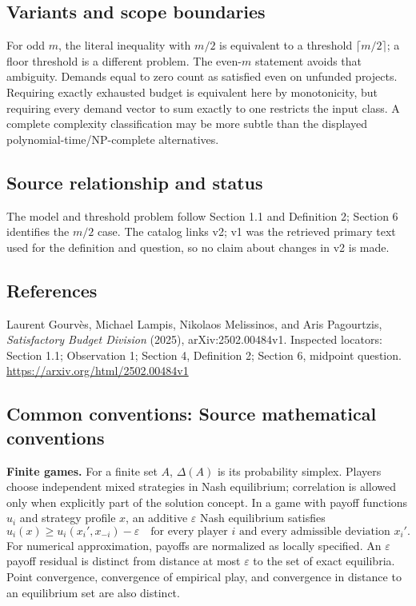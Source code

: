 \documentclass[11pt,a4paper]{article}
\begin{document}
\subsection*{Variants and scope boundaries}
For odd $m$, the literal inequality with $m/2$ is equivalent to a threshold $\lceil m/2\rceil$; a floor threshold is a different problem. The even-$m$ statement avoids that ambiguity. Demands equal to zero count as satisfied even on unfunded projects. Requiring exactly exhausted budget is equivalent here by monotonicity, but requiring every demand vector to sum exactly to one restricts the input class. A complete complexity classification may be more subtle than the displayed polynomial-time/NP-complete alternatives.

\subsection*{Source relationship and status}
The model and threshold problem follow Section 1.1 and Definition 2; Section 6 identifies the $m/2$ case. The catalog links v2; v1 was the retrieved primary text used for the definition and question, so no claim about changes in v2 is made.

\subsection*{References}
\begingroup\footnotesize\raggedright
\noindent [S1] Laurent Gourv\`es, Michael Lampis, Nikolaos Melissinos, and Aris Pagourtzis, \emph{Satisfactory Budget Division} (2025), arXiv:2502.00484v1. Inspected locators: Section 1.1; Observation 1; Section 4, Definition 2; Section 6, midpoint question.
\url{https://arxiv.org/html/2502.00484v1}
\par\endgroup

\subsection*{Common conventions: Source mathematical conventions}

\textbf{Finite games.} For a finite set $A$, $\Delta(A)$ is its probability
simplex. Players choose independent mixed strategies in Nash equilibrium;
correlation is allowed only when explicitly part of the solution concept.
In a game with payoff functions $u_i$ and strategy profile $x$, an additive
$\varepsilon$ Nash equilibrium satisfies
\[
 u_i(x)\geq u_i(x_i',x_{-i})-\varepsilon
 \quad\text{for every player $i$ and every admissible deviation $x_i'$}.
\]
For numerical approximation, payoffs are normalized as locally specified.
An $\varepsilon$ payoff residual is distinct from distance at most
$\varepsilon$ to the set of exact equilibria. Point convergence, convergence
of empirical play, and convergence in distance to an equilibrium set are
also distinct.
\end{document}
